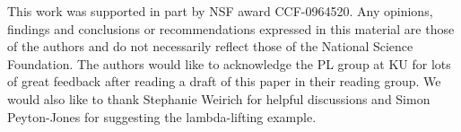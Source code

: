 \documentclass[natbib]{sigplanconf}
\begin{document}
\acks This work was supported in part by NSF award CCF-0964520. Any
opinions, findings and conclusions or recommendations expressed in
this material are those of the authors and do not necessarily
reflect those of the National Science Foundation.  The authors would
like to acknowledge the PL group at KU for lots of great feedback
after reading a draft of this paper in their reading group. We would
also like to thank Stephanie Weirich for helpful discussions and Simon
Peyton-Jones for suggesting the lambda-lifting example.




\end{document}

